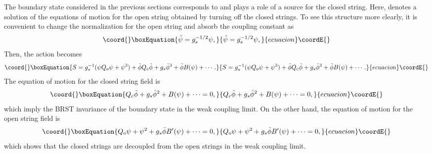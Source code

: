 \documentclass[a4paper,12pt]{article} \textheight=8.5truein
\begin{document}
The boundary state considered in the previous sections corresponds
to \coordHE{}
and plays a role of a source for the closed string.
Here, \coordHE{} denotes a solution of the equations of motion
for the open string obtained by turning off the closed strings.
To see this structure more clearly, it is convenient to
change the normalization for the open string and
absorb the coupling constant as
\begin{equation}\coord{}\boxEquation{
  \label{eq:normalization}
  \tilde{\psi}=g_s^{-1/2}\psi,
}{
  \tilde{\psi}=g_s^{-1/2}\psi,
}{ecuacion}\coordE{}\end{equation}
Then, the action becomes
\begin{equation}\coord{}\boxEquation{
  \label{eq:action2}
    S=g_s^{-1}(\psi Q_o \psi + \psi^3)+
 \tilde{\phi} Q_c \tilde{\phi} + g_s \tilde{\phi}^3+
 \tilde{\phi}B(\psi)+\cdots.
}{
  S=g_s^{-1}(\psi Q_o \psi + \psi^3)+
 \tilde{\phi} Q_c \tilde{\phi} + g_s \tilde{\phi}^3+
 \tilde{\phi}B(\psi)+\cdots.
}{ecuacion}\coordE{}\end{equation}
The equation of motion for the closed string field is
\begin{equation}\coord{}\boxEquation{
\label{closedEOM}
  Q_c\tilde\phi+g_s\tilde\phi^2+ B(\psi) +\cdots=0,
}{
Q_c\tilde\phi+g_s\tilde\phi^2+ B(\psi) +\cdots=0,
}{ecuacion}\coordE{}\end{equation}
which imply the BRST invariance of the boundary state
\coordHE{} in the weak coupling limit.
On the other hand, the equation of motion for the open string field is
\begin{equation}\coord{}\boxEquation{
  \label{eq:eom}
  Q_o\psi+\psi^2+g_s \tilde\phi B'(\psi)+\cdots=0,
}{
  Q_o\psi+\psi^2+g_s \tilde\phi B'(\psi)+\cdots=0,
}{ecuacion}\coordE{}\end{equation}
which shows that the closed strings are decoupled from the open
strings in the weak coupling limit.
\end{document}
